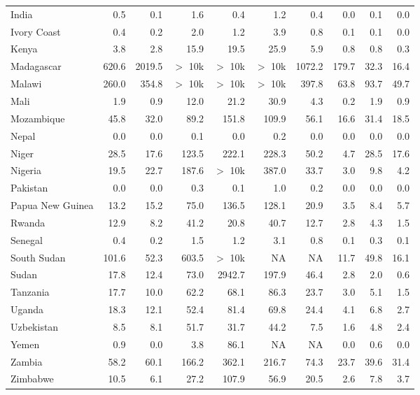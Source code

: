 \documentclass[12pt,english]{article}
\begin{document}
\begin{table}[b]
{\begin{tabular}[t]{lrrrrrrrrr}
        India & 0.5 & 0.1 & 1.6 & 0.4 & 1.2 & 0.4 & 0.0 & 0.1 & 0.0\\
        Ivory Coast & 0.4 & 0.2 & 2.0 & 1.2 & 3.9 & 0.8 & 0.1 & 0.1 & 0.0\\
        Kenya & 3.8 & 2.8 & 15.9 & 19.5 & 25.9 & 5.9 & 0.8 & 0.8 & 0.3\\
        Madagascar & 620.6 & 2019.5 & $>$ 10k & $>$ 10k & $>$ 10k & 1072.2 & 179.7 & 32.3 & 16.4\\
        Malawi & 260.0 & 354.8 & $>$ 10k & $>$ 10k & $>$ 10k & 397.8 & 63.8 & 93.7 & 49.7\\
        Mali & 1.9 & 0.9 & 12.0 & 21.2 & 30.9 & 4.3 & 0.2 & 1.9 & 0.9\\
        Mozambique & 45.8 & 32.0 & 89.2 & 151.8 & 109.9 & 56.1 & 16.6 & 31.4 & 18.5\\
        Nepal & 0.0 & 0.0 & 0.1 & 0.0 & 0.2 & 0.0 & 0.0 & 0.0 & 0.0\\
        Niger & 28.5 & 17.6 & 123.5 & 222.1 & 228.3 & 50.2 & 4.7 & 28.5 & 17.6\\
        Nigeria & 19.5 & 22.7 & 187.6 & $>$ 10k & 387.0 & 33.7 & 3.0 & 9.8 & 4.2\\
        Pakistan & 0.0 & 0.0 & 0.3 & 0.1 & 1.0 & 0.2 & 0.0 & 0.0 & 0.0\\
        Papua New Guinea & 13.2 & 15.2 & 75.0 & 136.5 & 128.1 & 20.9 & 3.5 & 8.4 & 5.7\\
        Rwanda & 12.9 & 8.2 & 41.2 & 20.8 & 40.7 & 12.7 & 2.8 & 4.3 & 1.5\\
        Senegal & 0.4 & 0.2 & 1.5 & 1.2 & 3.1 & 0.8 & 0.1 & 0.3 & 0.1\\
        South Sudan & 101.6 & 52.3 & 603.5 & $>$ 10k & NA & NA & 11.7 & 49.8 & 16.1\\
        Sudan & 17.8 & 12.4 & 73.0 & 2942.7 & 197.9 & 46.4 & 2.8 & 2.0 & 0.6\\
        Tanzania & 17.7 & 10.0 & 62.2 & 68.1 & 86.3 & 23.7 & 3.0 & 5.1 & 1.5\\
        Uganda & 18.3 & 12.1 & 52.4 & 81.4 & 69.8 & 24.4 & 4.1 & 6.8 & 2.7\\
        Uzbekistan & 8.5 & 8.1 & 51.7 & 31.7 & 44.2 & 7.5 & 1.6 & 4.8 & 2.4\\
        Yemen & 0.9 & 0.0 & 3.8 & 86.1 & NA & NA & 0.0 & 0.6 & 0.0\\
        Zambia & 58.2 & 60.1 & 166.2 & 362.1 & 216.7 & 74.3 & 23.7 & 39.6 & 31.4\\
        Zimbabwe & 10.5 & 6.1 & 27.2 & 107.9 & 56.9 & 20.5 & 2.6 & 7.8 & 3.7\\
        \bottomrule
        \end{tabular}}
        \end{table}
\end{document}
